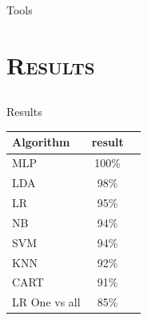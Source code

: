 \documentclass[xcolor=x11names,compress]{beamer}
\renewcommand{\(}{\begin{columns}}
\renewcommand{\)}{\end{columns}}
\newcommand{\<}[1]{\begin{column}{#1}}
\renewcommand{\>}{\end{column}}
\begin{document}
\begin{frame}{Tools}
\begin{itemize}
{\begin{figure}
                   \end{figure}				
			}
	\end{itemize}
\end{frame}

\section{\scshape Results}
\subsection{}
\begin{frame}{Results}

    \begin{table}[t]
    \begin{tabular}{|l|c|c|}
      \hline 
      Algorithm &  result \\
      \hline
      MLP & 100\% \\
      \hline
      LDA & 98\% \\
      \hline
      LR & 95\% \\
      \hline
      NB & 94\% \\
      \hline
      SVM & 94\% \\
      \hline
      KNN & 92\% \\
      \hline
      CART & 91\% \\
      \hline
      LR One vs all & 85\% \\
      \hline
    \end{tabular} \\
    \end{table}
	
\end{frame}
\end{document}
